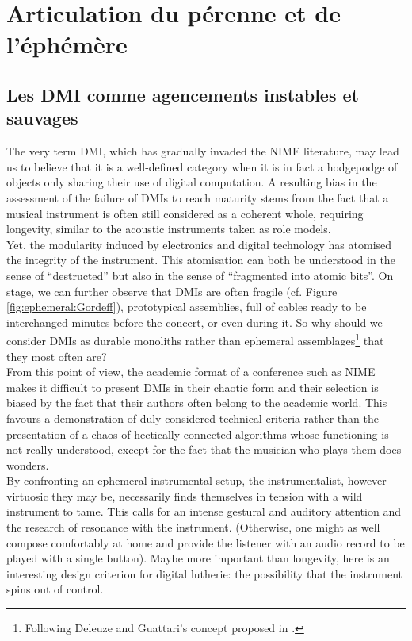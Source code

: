 \section{Articulation du pérenne et de l'éphémère}

\subsection{Les DMI comme agencements instables et sauvages}

The very term DMI, which has gradually invaded the NIME literature, may lead us to believe that it is a well-defined category when it is in fact a hodgepodge of objects only sharing their use of digital computation. A resulting bias in the assessment of the failure of DMIs to reach maturity stems from the fact that a musical instrument is often still considered as a coherent whole, requiring longevity, similar to the acoustic instruments taken as role models.\\
\indent Yet, the modularity induced by electronics and digital technology has atomised the integrity of the instrument. This atomisation can both be understood in the sense of “destructed” but also in the sense of “fragmented into atomic bits”. On stage, we can further observe that DMIs are often fragile (cf. Figure \ref{fig:ephemeral:Gordeff}), prototypical assemblies, full of cables ready to be interchanged minutes before the concert, or even during it. So why should we consider DMIs as durable monoliths rather than ephemeral assemblages\footnote{Following Deleuze and Guattari's concept proposed in \cite{deleuze_mille_1980}.} that they most often are?\\
\indent From this point of view, the academic format of a conference such as NIME makes it difficult to present DMIs in their chaotic form and their selection is biased by the fact that their authors often belong to the academic world. This favours a demonstration of duly considered technical criteria rather than the presentation of a chaos of hectically connected algorithms whose functioning is not really understood, except for the fact that the musician who plays them does wonders.\\
\indent By confronting an ephemeral instrumental setup, the instrumentalist, however virtuosic they may be, necessarily finds themselves in tension with a wild instrument to tame. This calls for an intense gestural and auditory attention and the research of resonance with the instrument. (Otherwise, one might as well compose comfortably at home and provide the listener with an audio record to be played with a single button). Maybe more important than longevity, here is an interesting design criterion for digital lutherie: the possibility that the instrument spins out of control.

